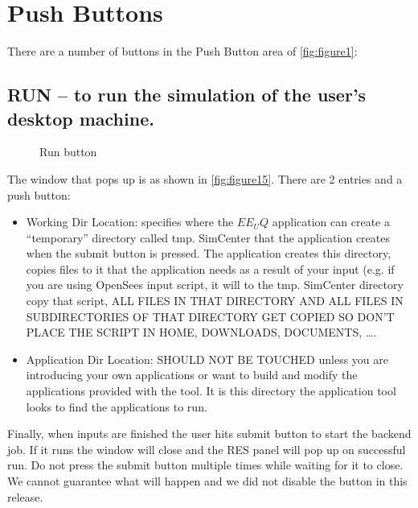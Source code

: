 \section{Push Buttons}
There are a number of buttons in the Push Button area of \autoref{fig:figure1}:
\subsection{RUN – to run the simulation of the user’s desktop machine.}
\begin{figure}[!htbp]
  \caption{Run button}
  \label{fig:figure15}
\end{figure}
The window that pops up is as shown in \autoref{fig:figure15}. There are 2 entries and a push button: 

\begin{itemize}
\item Working Dir Location: specifies where the $EE_UQ$ application can create a “temporary” directory called tmp. SimCenter that the application 
creates when the submit button is pressed. The application creates this directory, copies files to it that the application needs as a result of your 
input (e.g. if you are using OpenSees input script, it will to the tmp. SimCenter directory copy that script, ALL FILES IN THAT DIRECTORY AND ALL FILES IN 
SUBDIRECTORIES OF THAT DIRECTORY GET COPIED SO DON’T PLACE THE SCRIPT IN HOME, DOWNLOADS, DOCUMENTS, ….
\item Application Dir Location: SHOULD NOT BE TOUCHED unless you are introducing your own applications or want to build and modify the 
applications provided with the tool. It is this directory the application tool looks to find the applications to run.
\end{itemize}


Finally, when inputs are finished the user hits submit button to start the backend job. If it runs the window will close and the RES 
panel will pop up on successful run. Do not press the submit button multiple times while waiting for it to close. We cannot guarantee 
what will happen and we did not disable the button in this release.

